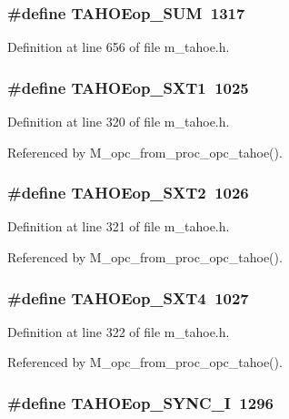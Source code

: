 \subsubsection{\setlength{\rightskip}{0pt plus 5cm}\#define TAHOEop\_\-SUM~1317}\label{m__tahoe_8h_5ef8a2ec742669b7b4548bf0dbf689d7}




Definition at line 656 of file m\_\-tahoe.h.
\subsubsection{\setlength{\rightskip}{0pt plus 5cm}\#define TAHOEop\_\-SXT1~1025}\label{m__tahoe_8h_ebd3b86b9650db76286471132196798f}




Definition at line 320 of file m\_\-tahoe.h.

Referenced by M\_\-opc\_\-from\_\-proc\_\-opc\_\-tahoe().
\subsubsection{\setlength{\rightskip}{0pt plus 5cm}\#define TAHOEop\_\-SXT2~1026}\label{m__tahoe_8h_ae021e473da3cc1f5277aeab9dd5b575}




Definition at line 321 of file m\_\-tahoe.h.

Referenced by M\_\-opc\_\-from\_\-proc\_\-opc\_\-tahoe().
\subsubsection{\setlength{\rightskip}{0pt plus 5cm}\#define TAHOEop\_\-SXT4~1027}\label{m__tahoe_8h_9984efe69bfb1fdfe43c14d1f389d72b}




Definition at line 322 of file m\_\-tahoe.h.

Referenced by M\_\-opc\_\-from\_\-proc\_\-opc\_\-tahoe().
\subsubsection{\setlength{\rightskip}{0pt plus 5cm}\#define TAHOEop\_\-SYNC\_\-I~1296}\label{m__tahoe_8h_47ff71adcfa7c29b25c38cf9667dde19}




